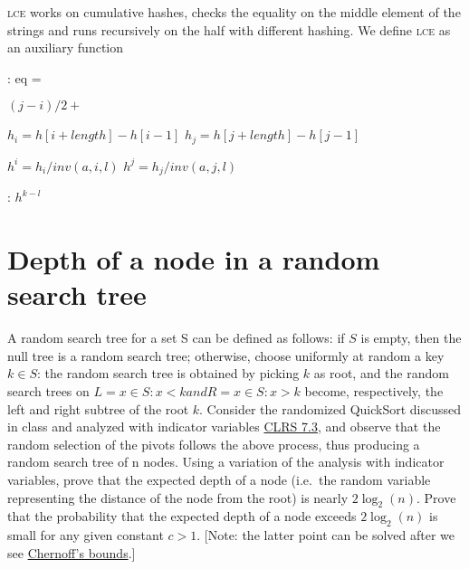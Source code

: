 \documentclass{article}
\begin{document}
\textsc{lce} works on cumulative hashes, checks the equality on the middle element
of the strings and runs recursively on the half with different hashing.
We define \textsc{lce} as an auxiliary function

\begin{algorithmic}[1]
  :
    \State eq = \;

        \Else $(j - i) / 2 + $      %
    \EndIf

    \State $h_i = h[i + length] - h[i - 1]$\;
    \State $h_j = h[j + length] - h[j - 1]$\;

    \State $h^{i} = h_i / inv(a, i, l)$\;
    \State $h^{j} = h_j / inv(a, j, l)$\;

    \;
    \EndFunction

    :
    \Return $h^{k - l}$
    \EndFunction
\end{algorithmic}


\newpage
\section{Depth of a node in a random search tree}

A random search tree for a set S can be defined as follows: if $S$ is empty, then
the null tree is a random search tree; otherwise, choose uniformly at random a key
$k \in S$: the random search tree is obtained by picking
$k$ as root, and the random search trees on $L = {x \in S : x < k} and R = {x \in S :
x > k}$ become, respectively, the left and right subtree of the root $k$.
Consider the randomized QuickSort discussed in class and analyzed with indicator
variables \href{http://didawiki.cli.di.unipi.it/lib/exe/fetch.php/magistraleinformatica/alg2/algo2_13/randqs.pdf}{CLRS 7.3},
and observe that the random selection of the pivots follows the above process,
thus producing a random search tree of n nodes. Using a variation of the analysis
with indicator variables, prove that the expected depth of a node (i.e.\ the random variable
representing the distance of the node from the root) is nearly $2\log_2 (n)$.
Prove that the probability that the expected depth of a node exceeds $2\log_2 (n)$ is small for
any given constant $c > 1$. [Note: the latter point can be solved after we see
\href{https://en.wikipedia.org/wiki/Chernoff_bound}{Chernoff’s bounds}.]
\end{document}
